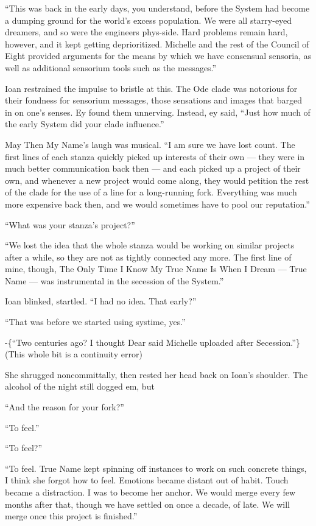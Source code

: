 ``This was back in the early days, you understand, before the System had become a dumping ground for the world's excess population. We were all starry-eyed dreamers, and so were the engineers phys-side. Hard problems remain hard, however, and it kept getting deprioritized. Michelle and the rest of the Council of Eight provided arguments for the means by which we have consensual sensoria, as well as additional sensorium tools such as the messages.''

Ioan restrained the impulse to bristle at this. The Ode clade was notorious for their fondness for sensorium messages, those sensations and images that barged in on one's senses. Ey found them unnerving. Instead, ey said, ``Just how much of the early System did your clade influence.''

May Then My Name's laugh was musical. ``I am sure we have lost count. The first lines of each stanza quickly picked up interests of their own — they were in much better communication back then — and each picked up a project of their own, and whenever a new project would come along, they would petition the rest of the clade for the use of a line for a long-running fork. Everything was much more expensive back then, and we would sometimes have to pool our reputation.''

``What was your stanza's project?''

``We lost the idea that the whole stanza would be working on similar projects after a while, so they are not as tightly connected any more. The first line of mine, though, The Only Time I Know My True Name Is When I Dream — True Name — was instrumental in the secession of the System.''

Ioan blinked, startled. ``I had no idea. That early?''

``That was before we started using systime, yes.''

-\{``Two centuries ago? I thought Dear said Michelle uploaded after Secession.''\}(This whole bit is a continuity error)

She shrugged noncommittally, then rested her head back on Ioan's shoulder. The alcohol of the night still dogged em, but

``And the reason for your fork?''

``To feel.''

``To feel?''

``To feel. True Name kept spinning off instances to work on such concrete things, I think she forgot how to feel. Emotions became distant out of habit. Touch became a distraction. I was to become her anchor. We would merge every few months after that, though we have settled on once a decade, of late. We will merge once this project is finished.''

